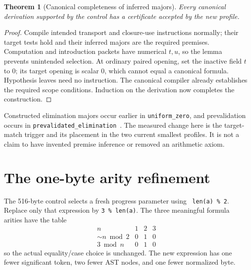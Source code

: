 \documentclass[11pt]{article}
\newtheorem{theorem}{Theorem}[section]
\theoremstyle{definition}
\theoremstyle{remark}
\begin{document}
\begin{theorem}[Canonical completeness of inferred majors]
Every canonical derivation supported by the control has a certificate
accepted by the new profile.
\end{theorem}
\begin{proof}
Compile intended transport and closure-use instructions normally; their
target tests hold and their inferred majors are the required premises.
Computation and introduction packets have numerical $t,u$, so the lemma
prevents unintended selection.  At ordinary paired opening, set the
inactive field $t$ to $0$; its target opening is scalar $0$, which cannot
equal a canonical formula.  Hypothesis leaves need no instruction.
The canonical compiler already establishes the required scope conditions.
Induction on the derivation now completes the construction.
\end{proof}

Constructed elimination majors occur earlier in \texttt{uniform\_zero},
and prevalidation occurs in \texttt{prevalidated\_elimination}~\cite{repo}.
The measured change here is the target-match trigger and its placement
in the two current smallest profiles.  It is not a claim to have invented
premise inference or removed an arithmetic axiom.

\section{The one-byte arity refinement}
\label{sec:remainder}

The 516-byte control selects a fresh progress parameter using
\texttt{\string~len(a) \% 2}.  Replace only that expression by
\texttt{3 \% len(a)}.  The three meaningful formula arities have the table
\[
\begin{array}{c|ccc}
n&1&2&3\\\hline
\mathord{\sim}n\bmod2&0&1&0\\
3\bmod n&0&1&0
\end{array}
\]
so the actual equality/case choice is unchanged.  The new expression
has one fewer significant token, two fewer AST nodes, and one fewer
normalized byte.
\end{document}
